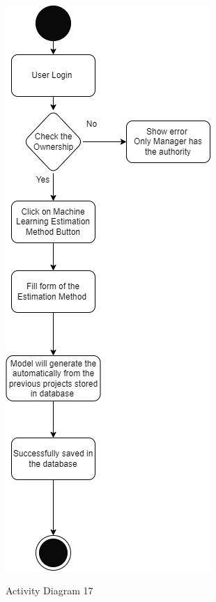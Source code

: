 \begin{figure}[H]
    \centering
    \caption{Activity Diagram 17}
    \includegraphics[scale=0.5]{./diagrams/Activity Diagram/ad-17.png}
    \label{fig:act-17}

\end{figure}


